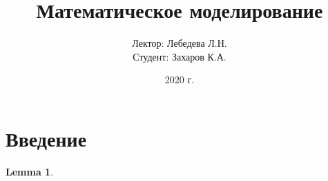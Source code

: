 \documentclass[12pt]{article}
\title{Математическое моделирование}
\author{Лектор: Лебедева Л.Н.\\Студент: Захаров К.А.}
\date{2020 г.}
\newtheorem*{lemma}{Lemma}
\theoremstyle{definition}
\theoremstyle{remark}
\begin{document}
\maketitle
\tableofcontents
\section{Введение}






\begin{lemma}

\end{lemma}
\end{document}
